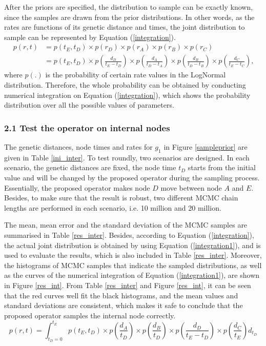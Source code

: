 \documentclass{bmcart}
\begin{document}
\begin{backmatter}
After the priors are specified, the distribution to sample can be exactly known, since the samples are drawn from the prior distributions. In other words, as the rates are functions of its genetic distance and times, the joint distribution to sample can be represented by Equation (\ref{integration}).
\begin{equation}\label{integration}
\begin{aligned}
p(r,t) &= p({t_E},{t_D}) \times p({r_D}) \times p({r_A}) \times p({r_B}) \times p({r_C}) \\&= p({t_E},{t_D}) \times p(\frac{{{d_D}}}{{t_E} - {t_D}}) \times p(\frac{{{d_A}}}{{t_D} - {t_A}}) \times p(\frac{{{d_B}}}{{t_D} - {t_B}}) \times p(\frac{{{d_C}}}{{t_E} - {t_C}})\text{,}
\end{aligned}
\end{equation}
where $p({.})$ is the probability of certain rate values in the LogNormal distribution. Therefore, the whole probability can be obtained by conducting numerical integration on Equation (\ref{integration}), which shows the probability distribution over all the possible values of parameters.

\subsubsection*{2.1 Test the operator on internal nodes}

The genetic distances, node times and rates for $g_1$ in Figure \ref{sampleprior} are given in Table \ref{ini_inter}. To test roundly, two scenarios are designed. In each scenario, the genetic distances are fixed, the node time $t_D$ starts from the initial value and will be changed by the proposed operator during the sampling process. Essentially, the proposed operator makes node $D$ move between node $A$ and $E$. Besides, to make sure that the result is robust, two different MCMC chain lengths are performed in each scenario, i.e. 10 million and 20 million.

The mean, mean error and the standard deviation of the MCMC samples are summarised in Table \ref{res_inter}. Besides, according to Equation (\ref{integration}), the actual joint distribution is obtained by using Equation (\ref{integration1}), and is used to evaluate the results, which is also included in Table \ref{res_inter}. Moreover, the histograms of MCMC samples that indicate the sampled distributions, as well as the curves of the numerical integration of Equation (\ref{integration1}), are shown in Figure \ref{res_int}. From Table \ref{res_inter} and Figure \ref{res_int}, it can be seen that the red curves well fit the black histograms, and the mean values and standard deviations are consistent, which makes it safe to conclude that the proposed operator samples the internal node correctly.
\begin{equation}
\label{integration1}
p(r,t) = \int_{{t_D} = 0}^{{t_E}} {p({t_E},{t_D}) \times p(\frac{{{d_A}}}{{{t_D}}}) \times p(\frac{{{d_B}}}{{{t_D}}}) \times p(\frac{{{d_D}}}{{{t_E} - {t_D}}}) \times p(\frac{{{d_C}}}{{{t_E}}}){d_{t_D}}}
\end{equation}


\end{backmatter}
\end{document}
